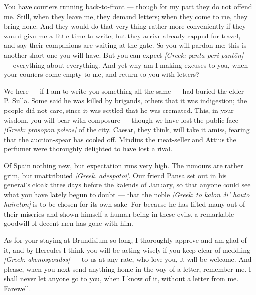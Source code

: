 

 You have couriers running back-to-front --- though for my part they do not offend me. Still, when they leave me, they demand letters; when they come to me, they bring none. And they would do that very thing rather more conveniently if they would give me a little time to write; but they arrive already capped for travel, and say their companions are waiting at the gate. So you will pardon me; this is another short one you will have. But you can expect \textit{[Greek: panta peri pantōn]} --- everything about everything. And yet why am I making excuses to you, when your couriers come empty to me, and return to you with letters?

 We here --- if I am to write you something all the same --- had buried the elder P. Sulla. Some said he was killed by brigands, others that it was indigestion; the people did not care, since it was settled that he was cremated. This, in your wisdom, you will bear with composure --- though we have lost the public face \textit{[Greek: prosōpon poleōs]} of the city. Caesar, they think, will take it amiss, fearing that the auction-spear has cooled off. Mindius the meat-seller and Attius the perfumer were thoroughly delighted to have lost a rival.

 Of Spain nothing new, but expectation runs very high. The rumours are rather grim, but unattributed \textit{[Greek: adespotoi]}. Our friend Pansa set out in his general's cloak three days before the kalends of January, so that anyone could see what you have lately begun to doubt --- that the noble \textit{[Greek: to kalon di' hauto haireton]} is to be chosen for its own sake. For because he has lifted many out of their miseries and shown himself a human being in these evils, a remarkable goodwill of decent men has gone with him.

 As for your staying at Brundisium so long, I thoroughly approve and am glad of it, and by Hercules I think you will be acting wisely if you keep clear of meddling \textit{[Greek: akenospoudos]} --- to us at any rate, who love you, it will be welcome. And please, when you next send anything home in the way of a letter, remember me. I shall never let anyone go to you, when I know of it, without a letter from me. Farewell.
